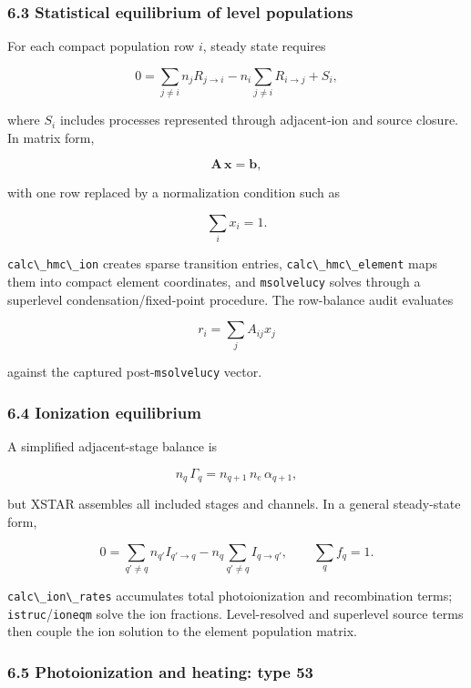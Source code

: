 \documentclass[
  10pt,
]{article}
\newcommand{\passthrough}[1]{#1}
\begin{document}
\subsubsection{6.3 Statistical equilibrium of level
populations}\label{statistical-equilibrium-of-level-populations}

For each compact population row \(i\), steady state requires

\[
0 = \sum_{j\ne i} n_j R_{j\rightarrow i}
    -n_i\sum_{j\ne i}R_{i\rightarrow j}
    +S_i,
\]

where \(S_i\) includes processes represented through adjacent-ion and
source closure. In matrix form,

\[
\mathbf{{A}}\,\mathbf{{x}}=\mathbf{{b}},
\]

with one row replaced by a normalization condition such as

\[
\sum_i x_i=1.
\]

\passthrough{\lstinline!calc\_hmc\_ion!} creates sparse transition
entries, \passthrough{\lstinline!calc\_hmc\_element!} maps them into
compact element coordinates, and \passthrough{\lstinline!msolvelucy!}
solves through a superlevel condensation/fixed-point procedure. The
row-balance audit evaluates

\[
r_i=\sum_j A_{{ij}}x_j
\]

against the captured post-\passthrough{\lstinline!msolvelucy!} vector.

\subsubsection{6.4 Ionization equilibrium}\label{ionization-equilibrium}

A simplified adjacent-stage balance is

\[
n_q\,\Gamma_q = n_{{q+1}}\,n_e\,\alpha_{{q+1}},
\]

but XSTAR assembles all included stages and channels. In a general
steady-state form,

\[
0=\sum_{{q'\ne q}} n_{{q'}} I_{{q'\rightarrow q}}
  -n_q\sum_{{q'\ne q}} I_{{q\rightarrow q'}},
\qquad
\sum_q f_q=1.
\]

\passthrough{\lstinline!calc\_ion\_rates!} accumulates total
photoionization and recombination terms;
\passthrough{\lstinline!istruc!}/\passthrough{\lstinline!ioneqm!} solve
the ion fractions. Level-resolved and superlevel source terms then
couple the ion solution to the element population matrix.

\subsubsection{6.5 Photoionization and heating: type
53}\label{photoionization-and-heating-type-53}
\end{document}

